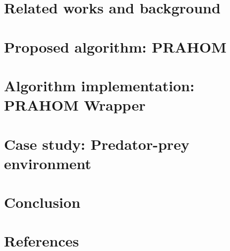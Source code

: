 \documentclass[runningheads]{llncs}
\begin{document}






\section{Related works and background}

\section{Proposed algorithm: PRAHOM}

\section{Algorithm implementation: PRAHOM Wrapper}

\section{Case study: Predator-prey environment}

\section{Conclusion}

\section*{References}

% 



\end{document}

